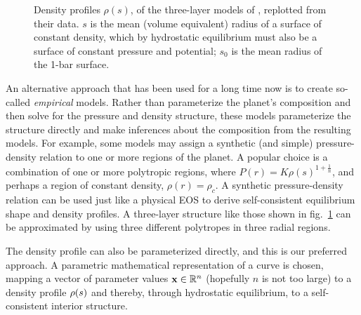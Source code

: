 \begin{figure}[tb!]
\centering
{}
\caption{Density profiles $\rho(s)$, of the three-layer models of 
\citet{Nettelmann2013b}, replotted from their data. $s$ is the mean (volume
equivalent) radius of a surface of constant density, which by hydrostatic
equilibrium must also be a surface of constant pressure and potential; $s_0$ is
the mean radius of the 1-bar surface.}
\label{fig:N13_profs}
\end{figure}

An alternative approach that has been used for a long time now is to create
so-called \emph{empirical} models. Rather than parameterize the planet's
composition and then solve for the pressure and density structure, these models
parameterize the structure directly and make inferences about the composition
from the resulting models. For example, some models may assign a synthetic (and
simple) pressure-density relation to one or more regions of the planet. A
popular choice is a combination of one or more polytropic regions, where
$P(r)=K\rho(s)^{1+\frac{1}{n}}$, and perhaps a region of constant density,
$\rho(r)=\rho_c$. A synthetic pressure-density relation can be used just like a
physical EOS to derive self-consistent equilibrium shape and density profiles. A
three-layer structure like those shown in fig.~\ref{fig:N13_profs} can be
approximated by using three different polytropes in three radial regions.

The density profile can also be parameterized directly, and this is our
preferred approach. A parametric mathematical representation of a curve is
chosen, mapping a vector of parameter values $\mathbf{x}\in{\mathbb{R}^n}$ (hopefully
$n$ is not too large) to a density profile $\rho(s)$ and thereby, through
hydrostatic equilibrium, to a self-consistent interior structure.